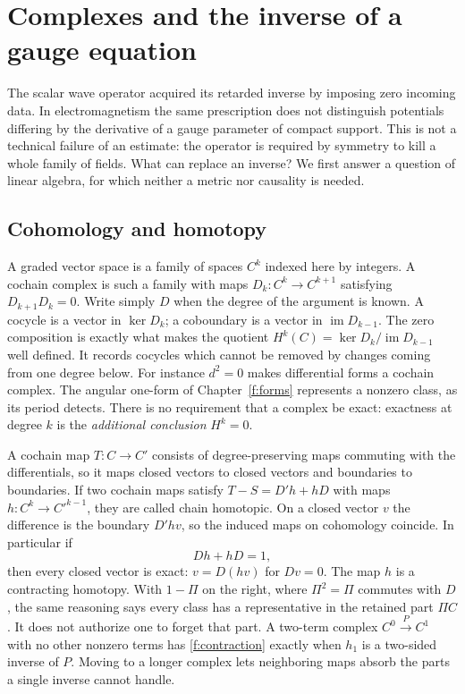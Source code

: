 \chapter{Complexes and the inverse of a gauge equation}\label{f:gauge-complex}
The scalar wave operator acquired its retarded inverse by imposing zero incoming data. In electromagnetism the same prescription does not distinguish potentials differing by the derivative of a gauge parameter of compact support. This is not a technical failure of an estimate: the operator is required by symmetry to kill a whole family of fields. What can replace an inverse? We first answer a question of linear algebra, for which neither a metric nor causality is needed.

\section{Cohomology and homotopy}
A graded vector space is a family of spaces $C^k$ indexed here by integers. A cochain complex is such a family with maps $D_k:C^k\to C^{k+1}$ satisfying $D_{k+1}D_k=0$. Write simply $D$ when the degree of the argument is known. A cocycle is a vector in $\ker D_k$; a coboundary is a vector in $\operatorname{im}D_{k-1}$. The zero composition is exactly what makes the quotient $H^k(C)=\ker D_k/\operatorname{im}D_{k-1}$ well defined. It records cocycles which cannot be removed by changes coming from one degree below. For instance $d^2=0$ makes differential forms a cochain complex. The angular one-form of Chapter~\ref{f:forms} represents a nonzero class, as its period detects. There is no requirement that a complex be exact: exactness at degree $k$ is the \emph{additional conclusion} $H^k=0$.

A cochain map $T:C\to C'$ consists of degree-preserving maps commuting with the differentials, so it maps closed vectors to closed vectors and boundaries to boundaries. If two cochain maps satisfy $T-S=D' h+hD$ with maps $h:C^k\to C'^{k-1}$, they are called chain homotopic. On a closed vector $v$ the difference is the boundary $D'hv$, so the induced maps on cohomology coincide. In particular if
\begin{equation}
 Dh+hD=1,\label{f:contraction}
\end{equation}
then every closed vector is exact: $v=D(hv)$ for $Dv=0$. The map $h$ is a contracting homotopy. With $1-\Pi$ on the right, where $\Pi^2=\Pi$ commutes with $D$, the same reasoning says every class has a representative in the retained part $\Pi C$. It does not authorize one to forget that part. A two-term complex $C^0\xrightarrow{P}C^1$ with no other nonzero terms has \eqref{f:contraction} exactly when $h_1$ is a two-sided inverse of $P$. Moving to a longer complex lets neighboring maps absorb the parts a single inverse cannot handle.

